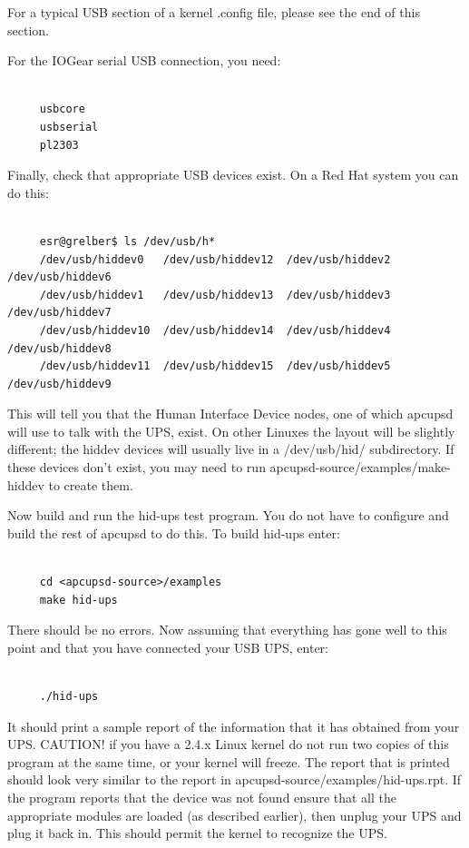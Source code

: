 For a typical USB section of a kernel .config file, please see the end of this
section.  

For the IOGear serial USB connection, you need: 

\footnotesize
\begin{verbatim}
     
     usbcore
     usbserial
     pl2303
\end{verbatim}
\normalsize

Finally, check that appropriate USB devices exist.  On a Red Hat system you
can do this: 

\footnotesize
\begin{verbatim}
     
     esr@grelber$ ls /dev/usb/h*
     /dev/usb/hiddev0   /dev/usb/hiddev12  /dev/usb/hiddev2  /dev/usb/hiddev6
     /dev/usb/hiddev1   /dev/usb/hiddev13  /dev/usb/hiddev3  /dev/usb/hiddev7
     /dev/usb/hiddev10  /dev/usb/hiddev14  /dev/usb/hiddev4  /dev/usb/hiddev8
     /dev/usb/hiddev11  /dev/usb/hiddev15  /dev/usb/hiddev5  /dev/usb/hiddev9
\end{verbatim}
\normalsize

This will tell you that the Human Interface Device nodes, one of which apcupsd
will use to talk with the UPS, exist.  On other Linuxes the layout will be
slightly different; the hiddev devices will usually live in a /dev/usb/hid/
subdirectory. If these devices don't exist, you may need to run
\lt{}apcupsd-source\gt{}/examples/make-hiddev to create them.  

Now build and run the hid-ups test program. You do not have to configure and
build the rest of apcupsd to do this.  To build hid-ups enter: 

\footnotesize
\begin{verbatim}
     
     cd <apcupsd-source>/examples
     make hid-ups
\end{verbatim}
\normalsize

There should be no errors. Now assuming that everything has gone well to this
point and that you have connected your USB UPS, enter:  

\label{index-hid_002dups-17}

\footnotesize
\begin{verbatim}
     
     ./hid-ups
\end{verbatim}
\normalsize

It should print a sample report of the information that it has obtained from
your UPS. CAUTION! if you have a 2.4.x Linux kernel do not run two copies of
this program at the same time, or your kernel will freeze. The report that is
printed should look very similar to the report in
\lt{}apcupsd-source\gt{}/examples/hid-ups.rpt. If the program reports that the
device was not found ensure that all the appropriate modules are loaded (as
described earlier), then unplug your UPS and plug it back in. This should
permit the kernel to recognize the UPS.  

